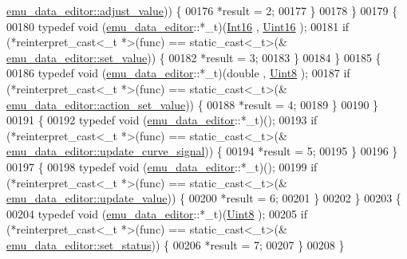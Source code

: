 \begin{DoxyCode}
      \hyperlink{a00004_a74d292de22b341313df1852cb1033704}{emu\_data\_editor::adjust\_value})) \{
00176                 *result = 2;
00177             \}
00178         \}
00179         \{
00180             \textcolor{keyword}{typedef} void (\hyperlink{a00004}{emu\_data\_editor}::*\_t)(\hyperlink{a00001_a3985266aecb120f269789241c170850c}{Int16} , 
      \hyperlink{a00001_aae7407b021d43f7193a81a58cfb3e297}{Uint16} );
00181             \textcolor{keywordflow}{if} (*reinterpret\_cast<\_t *>(func) == \textcolor{keyword}{static\_cast<}\_t\textcolor{keyword}{>}(&
      \hyperlink{a00004_a9d26460f253a29dd961b20be0afb5358}{emu\_data\_editor::set\_value})) \{
00182                 *result = 3;
00183             \}
00184         \}
00185         \{
00186             \textcolor{keyword}{typedef} void (\hyperlink{a00004}{emu\_data\_editor}::*\_t)(double , \hyperlink{a00001_a979e3e23b9a449e69ab6a8a83b6042f8}{Uint8} );
00187             \textcolor{keywordflow}{if} (*reinterpret\_cast<\_t *>(func) == \textcolor{keyword}{static\_cast<}\_t\textcolor{keyword}{>}(&
      \hyperlink{a00004_a7c1fa0d7d1623b11d4badceb1854010e}{emu\_data\_editor::action\_set\_value})) \{
00188                 *result = 4;
00189             \}
00190         \}
00191         \{
00192             \textcolor{keyword}{typedef} void (\hyperlink{a00004}{emu\_data\_editor}::*\_t)();
00193             \textcolor{keywordflow}{if} (*reinterpret\_cast<\_t *>(func) == \textcolor{keyword}{static\_cast<}\_t\textcolor{keyword}{>}(&
      \hyperlink{a00004_a7dfbddd62d6782b0f0ce809cbf2338ba}{emu\_data\_editor::update\_curve\_signal})) \{
00194                 *result = 5;
00195             \}
00196         \}
00197         \{
00198             \textcolor{keyword}{typedef} void (\hyperlink{a00004}{emu\_data\_editor}::*\_t)();
00199             \textcolor{keywordflow}{if} (*reinterpret\_cast<\_t *>(func) == \textcolor{keyword}{static\_cast<}\_t\textcolor{keyword}{>}(&
      \hyperlink{a00004_ad5f20fdbb4731185020ff4e90cd1ead2}{emu\_data\_editor::update\_value})) \{
00200                 *result = 6;
00201             \}
00202         \}
00203         \{
00204             \textcolor{keyword}{typedef} void (\hyperlink{a00004}{emu\_data\_editor}::*\_t)(\hyperlink{a00001_a979e3e23b9a449e69ab6a8a83b6042f8}{Uint8} );
00205             \textcolor{keywordflow}{if} (*reinterpret\_cast<\_t *>(func) == \textcolor{keyword}{static\_cast<}\_t\textcolor{keyword}{>}(&
      \hyperlink{a00004_a9476424a86a6ed4f84c64d0ac77143cc}{emu\_data\_editor::set\_status})) \{
00206                 *result = 7;
00207             \}
00208         \}

\end{DoxyCode}
